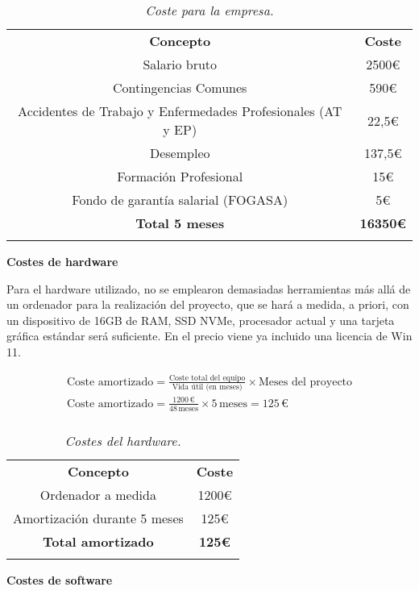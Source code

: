 \begin{table}[H]
    \centering
    \begin{tabular}{| c | c |}
        \Xhline{2\arrayrulewidth}
        \textbf{Concepto} & \textbf{Coste} \\ \Xhline{2\arrayrulewidth}
        Salario bruto & 2500€ \\ \hline
        Contingencias Comunes & 590€ \\ \hline
        Accidentes de Trabajo y Enfermedades Profesionales (AT y EP) & 22,5€ \\ \hline
        Desempleo & 137,5€ \\ \hline
        Formación Profesional & 15€ \\ \hline
        Fondo de garantía salarial (FOGASA) & 5€ \\ \hline
        \Xhline{2\arrayrulewidth}
        \textbf{Total 5 meses} & \textbf{16350€} \\ \Xhline{2\arrayrulewidth}
    \end{tabular}
    \caption{\textit{Coste para la empresa.}}
\end{table}

\textbf{Costes de hardware}

Para el hardware utilizado, no se emplearon demasiadas herramientas más allá de un ordenador para la realización del proyecto,
que se hará a medida, a priori, con un dispositivo de 16GB de RAM, SSD NVMe, procesador actual y una tarjeta gráfica estándar
será suficiente.
En el precio viene ya incluido una licencia de Win 11.

\begin{gather*}
    \text{Coste amortizado} = \frac{\text{Coste total del equipo}}{\text{Vida útil (en meses)}} \times \text{Meses del proyecto}\\
    \text{Coste amortizado} = \frac{1200\,€}{48\,\text{meses}} \times 5\,\text{meses} = 125\,€\\
\end{gather*}

\begin{table}[H]
    \centering
    \begin{tabular}{| c | c |}
        \Xhline{2\arrayrulewidth}
        \textbf{Concepto} & \textbf{Coste} \\ \Xhline{2\arrayrulewidth}
        Ordenador a medida & 1200€ \\ \hline
        Amortización durante 5 meses & 125€ \\ \hline
        \Xhline{2\arrayrulewidth}
        \textbf{Total amortizado} & \textbf{125€} \\ \Xhline{2\arrayrulewidth}
    \end{tabular}
    \caption{\textit{Costes del hardware.}}
\end{table}
\textbf{Costes de software}

